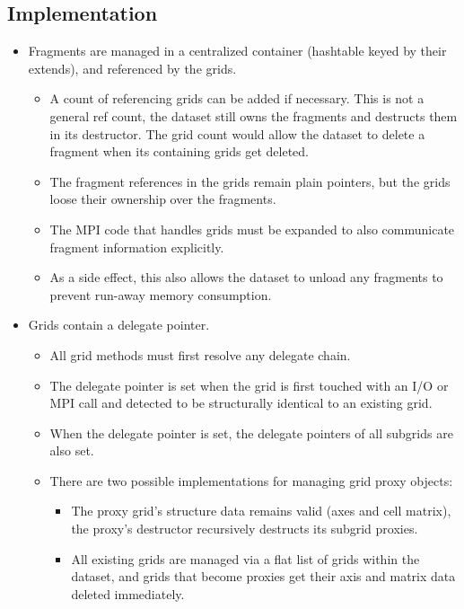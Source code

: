 \subsection{Implementation}
\begin{itemize}
  \item Fragments are managed in a centralized container (hashtable keyed by their extends), and referenced by the grids.
    \begin{itemize}
      \item A count of referencing grids can be added if necessary.
        This is not a general ref count, the dataset still owns the fragments and destructs them in its destructor.
        The grid count would allow the dataset to delete a fragment when its containing grids get deleted.
      \item The fragment references in the grids remain plain pointers, but the grids loose their ownership over the fragments.
      \item The MPI code that handles grids must be expanded to also communicate fragment information explicitly.
      \item As a side effect, this also allows the dataset to unload any fragments to prevent run-away memory consumption.
    \end{itemize}
  \item Grids contain a delegate pointer.
    \begin{itemize}
      \item All grid methods must first resolve any delegate chain.
      \item The delegate pointer is set when the grid is first touched with an I/O or MPI call and detected to be structurally identical to an existing grid.
      \item When the delegate pointer is set, the delegate pointers of all subgrids are also set.
      \item There are two possible implementations for managing grid proxy objects:
        \begin{itemize}
          \item The proxy grid's structure data remains valid (axes and cell matrix), the proxy's destructor recursively destructs its subgrid proxies.
          \item All existing grids are managed via a flat list of grids within the dataset, and grids that become proxies get their axis and matrix data deleted immediately.
        \end{itemize}
    \end{itemize}
\end{itemize}




